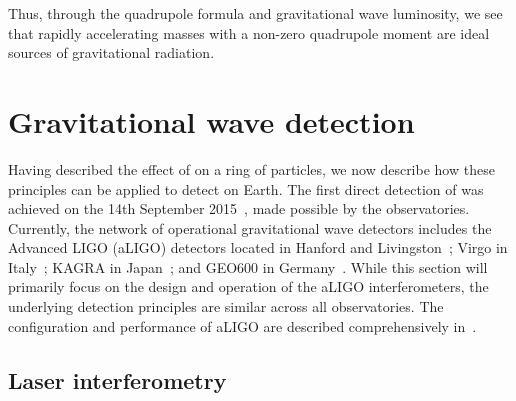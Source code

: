 Thus, through the quadrupole formula and gravitational wave luminosity, we see that rapidly accelerating masses with a non-zero quadrupole moment are ideal sources of gravitational radiation.





















\section{\label{1:sec:gravitational-wave-detection}Gravitational wave detection}

Having described the effect of \gws on a ring of particles, we now describe how these principles can be applied to detect \gws on Earth. The first direct detection of \gws was achieved on the 14th September 2015~\cite{GW150914:2016}, made possible by the \gwadj observatories. Currently, the network of operational gravitational wave detectors includes the Advanced LIGO (aLIGO) detectors located in Hanford and Livingston~\cite{aLIGO:2015}; Virgo in Italy~\cite{aVirgo:2015}; KAGRA in Japan~\cite{KAGRA:2021}; and GEO600 in Germany~\cite{GEO600:2002}. While this section will primarily focus on the design and operation of the aLIGO interferometers, the underlying detection principles are similar across all observatories. The configuration and performance of aLIGO are described comprehensively in~\cite{aLIGO:2015}.

\subsection{\label{1:sec:laser_interferometry}Laser interferometry}

